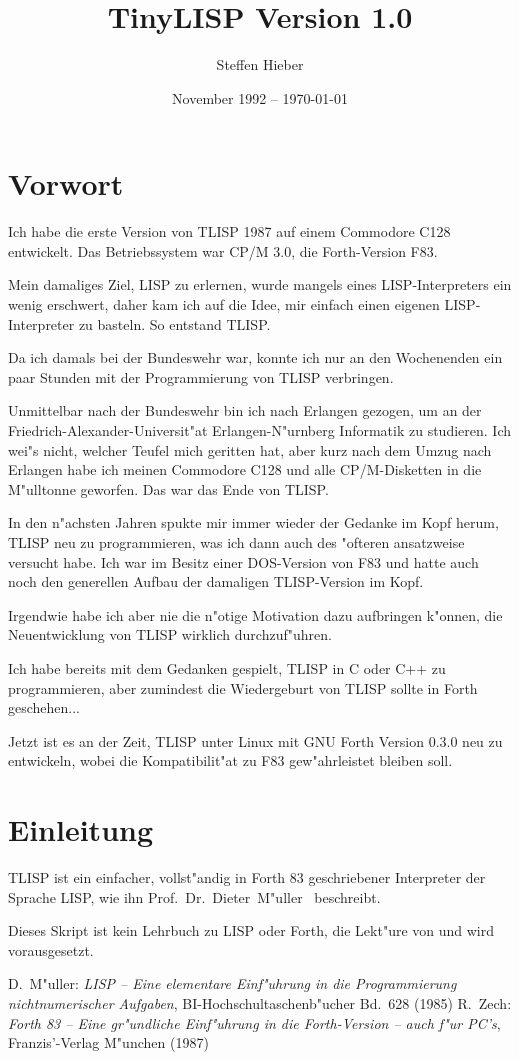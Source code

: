 \documentclass[11pt,a4paper,titlepage]{article}
\title{TinyLISP Version 1.0}
\author{Steffen Hieber}
\date{November 1992 -- \today}
\begin{document}
\maketitle
\tableofcontents
\newpage

\section{Vorwort}
Ich habe die erste Version von TLISP 1987 auf einem Commodore C128 entwickelt. 
Das Betriebssystem war CP/M 3.0, die Forth-Version F83.

Mein damaliges Ziel, LISP zu erlernen, wurde mangels eines LISP-Interpreters
ein wenig erschwert, daher kam ich auf die Idee, mir einfach einen eigenen
LISP-Interpreter zu basteln. So entstand TLISP.

Da ich damals bei der Bundeswehr war, konnte ich nur an den Wochenenden ein
paar Stunden mit der Programmierung von TLISP verbringen.

Unmittelbar nach der Bundeswehr bin ich nach Erlangen gezogen, um an der
Friedrich-Alexander-Universit"at Erlangen-N"urnberg Informatik zu studieren.
Ich wei"s nicht, welcher Teufel mich geritten hat, aber kurz nach dem Umzug
nach Erlangen habe ich meinen Commodore C128 und alle CP/M-Disketten in die
M"ulltonne geworfen. Das war das Ende von TLISP.

In den n"achsten Jahren spukte mir immer wieder der Gedanke im Kopf herum,
TLISP neu zu programmieren, was ich dann auch des "ofteren ansatzweise
versucht habe. Ich war im Besitz einer DOS-Version von F83 und hatte auch
noch den generellen Aufbau der damaligen TLISP-Version im Kopf. 

Irgendwie habe ich aber nie die n"otige Motivation dazu aufbringen k"onnen,
die Neuentwicklung von TLISP wirklich durchzuf"uhren.

Ich habe bereits mit dem Gedanken gespielt, TLISP in C oder C++ zu 
programmieren, aber zumindest die Wiedergeburt von TLISP sollte in Forth
geschehen...

Jetzt ist es an der Zeit, TLISP unter Linux mit GNU Forth Version 0.3.0
neu zu entwickeln, wobei die Kompatibilit"at zu F83 gew"ahrleistet bleiben
soll.

\section{Einleitung}
TLISP ist ein einfacher, vollst"andig in Forth 83 geschriebener Interpreter
der Sprache LISP, wie ihn Prof.~Dr.~Dieter~M"uller~\cite{mu} beschreibt.

Dieses Skript ist kein Lehrbuch zu LISP oder Forth, die Lekt"ure von \cite{mu}
und \cite{ze} wird vorausgesetzt. 

\newpage
\begin{thebibliography}{9}
D.~M"uller: {\it LISP -- Eine elementare Einf"uhrung in die Programmierung
nicht\-numerischer Aufgaben}, BI-Hochschultaschenb"ucher Bd.~628 (1985)
R.~Zech: {\it Forth 83 -- Eine gr"undliche Einf"uhrung in die Forth-Version --
auch f"ur PC's}, Franzis'-Verlag M"unchen (1987)
\end{thebibliography}
\end{document}
